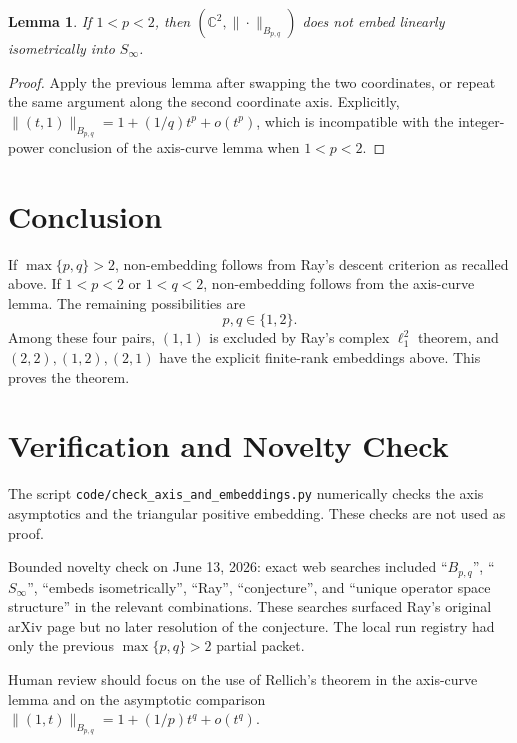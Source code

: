 \documentclass[11pt]{article}
\newtheorem{lemma}{Lemma}
\newcommand{\C}{\mathbb C}
\newcommand{\Sinf}{S_\infty}
\begin{document}
\begin{lemma}
If \(1<p<2\), then
\((\C^2,\|\cdot\|_{B_{p,q}})\) does not embed linearly isometrically into
\(\Sinf\).
\end{lemma}

\begin{proof}
Apply the previous lemma after swapping the two coordinates, or repeat the
same argument along the second coordinate axis.  Explicitly,
\(\|(t,1)\|_{B_{p,q}}=1+(1/q)t^p+o(t^p)\), which is incompatible with the
integer-power conclusion of the axis-curve lemma when \(1<p<2\).
\end{proof}

\section{Conclusion}

If \(\max\{p,q\}>2\), non-embedding follows from Ray's descent criterion as
recalled above.  If \(1<p<2\) or \(1<q<2\), non-embedding follows from the
axis-curve lemma.  The remaining possibilities are
\[
  p,q\in\{1,2\}.
\]
Among these four pairs, \((1,1)\) is excluded by Ray's complex
\(\ell_1^2\) theorem, and \((2,2),(1,2),(2,1)\) have the explicit finite-rank
embeddings above.  This proves the theorem.

\section{Verification and Novelty Check}

The script \texttt{code/check\_axis\_and\_embeddings.py} numerically checks
the axis asymptotics and the triangular positive embedding.  These checks are
not used as proof.

Bounded novelty check on June 13, 2026: exact web searches included
``\(B_{p,q}\)'', ``\(S_\infty\)'', ``embeds isometrically'', ``Ray'',
``conjecture'', and ``unique operator space structure'' in the relevant
combinations.  These searches surfaced Ray's original arXiv page but no later
resolution of the conjecture.  The local run registry had only the previous
\(\max\{p,q\}>2\) partial packet.

Human review should focus on the use of Rellich's theorem in the axis-curve
lemma and on the asymptotic comparison
\(\|(1,t)\|_{B_{p,q}}=1+(1/p)t^q+o(t^q)\).
\end{document}
